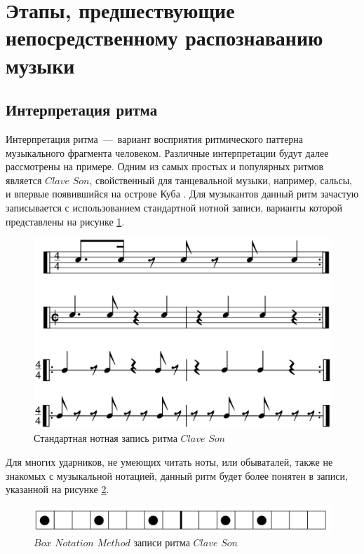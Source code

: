 \section{Этапы, предшествующие непосредственному распознаванию музыки}
\subsection{Интерпретация ритма}
Интерпретация ритма~---~вариант восприятия ритмического паттерна музыкального фрагмента человеком. Различные интерпретации будут далее рассмотрены на примере.
Одним из самых простых и популярных ритмов является $Clave$ $Son$, свойственный для танцевальной музыки, например, сальсы, и впервые появившийся на острове Куба \cite{bib3}. Для музыкантов данный ритм зачастую записывается с использованием стандартной нотной записи, варианты которой представлены на рисунке \ref{img:tab}.

\begin{figure}[h!]
    \centering
    \includegraphics[scale=0.5]{img/tab.pdf}
    \caption{Стандартная нотная запись ритма $Clave$ $Son$ \cite{bib3}}
    \label{img:tab}
\end{figure}

Для многих ударников, не умеющих читать ноты, или обываталей, также не знакомых с музыкальной нотацией, данный ритм будет более понятен в  записи, указанной на рисунке \ref{img:box}.

\begin{figure}[h!]
    \centering
    \includegraphics[scale=0.53]{img/box.pdf}
    \caption{$Box$ $Notation$ $Method$ записи ритма $Clave$ $Son$ \cite{bib3}}
    \label{img:box}
\end{figure}


